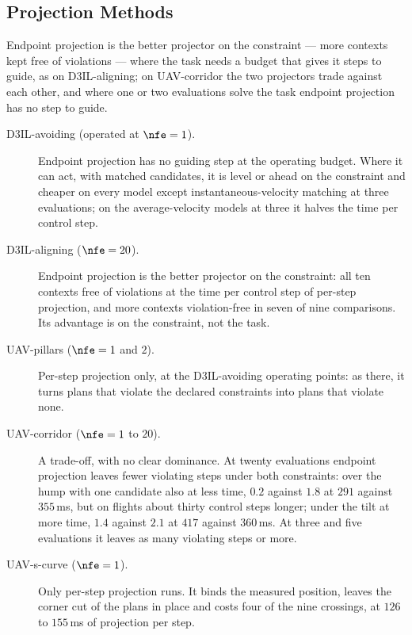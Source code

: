 \subsection{Projection Methods}\label{sec:res:constraints}

Endpoint projection is the better projector on the constraint --- more contexts kept free of violations --- where the task needs a budget that gives it
steps to guide, as on D3IL-aligning; on UAV-corridor the two projectors trade against each other, and where one
or two evaluations solve the task endpoint projection has no step to guide.

\begin{description}
  \item[D3IL-avoiding (operated at $\nfe=1$).] Endpoint projection has no guiding step at the operating
    budget. Where it can act, with matched candidates, it is level or ahead on the constraint and cheaper on
    every model except instantaneous-velocity matching at three evaluations; on the average-velocity models
    at three it halves the time per control step.
  \item[D3IL-aligning ($\nfe=20$).] Endpoint projection is the better projector on the constraint: all ten
    contexts free of violations at the time per control step of per-step projection, and more contexts
    violation-free in seven of nine comparisons. Its advantage is on the constraint, not the task.
  \item[UAV-pillars ($\nfe=1$ and $2$).] Per-step projection only, at the D3IL-avoiding operating points: as
    there, it turns plans that violate the declared constraints into plans that violate none.
  \item[UAV-corridor ($\nfe=1$ to $20$).] A trade-off, with no clear dominance. At twenty evaluations endpoint
    projection leaves fewer violating steps under both constraints: over the hump with one candidate also at
    less time, $0.2$ against $1.8$ at $291$ against $355$\,ms, but on flights about thirty control steps
    longer; under the tilt at more time, $1.4$ against $2.1$ at $417$ against $360$\,ms. At three and five
    evaluations it leaves as many violating steps or more.
  \item[UAV-s-curve ($\nfe=1$).] Only per-step projection runs. It binds the measured position, leaves the
    corner cut of the plans in place and costs four of the nine crossings, at $126$ to $155$\,ms of
    projection per step.
\end{description}

